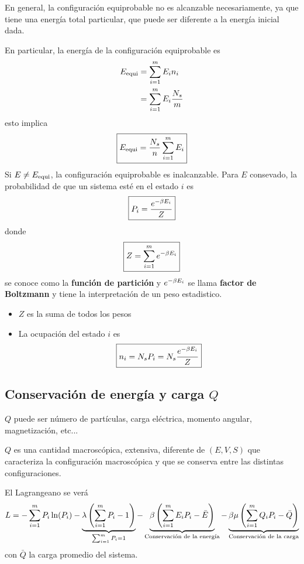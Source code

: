 En general, la configuración equiprobable no es alcanzable necesariamente, ya que tiene una energía total particular, que puede ser diferente a la energía inicial dada.

En particular, la energía de la configuración equiprobable es
\begin{align}
  E_{\rm equi}&=\sum_{i=1}^m E_in_i\\
  &=\sum_{i=1}^m E_i\frac{N_s}{m}
\end{align}
esto implica
\begin{equation}
  \boxed{E_{\rm equi}=\frac{N_s}{n}\sum_{i=1}^m E_i}
\end{equation}
Si $E\neq E_{\rm equi}$, la configuración equiprobable es inalcanzable. Para $E$ consevado, la probabilidad de que un sistema esté en el estado $i$ es
\begin{equation}
 \boxed{P_i=\frac{e^{-\beta E_i}}{Z}}
\end{equation}
donde
\begin{equation}
\boxed{ Z=\sum_{i=1}^m e^{-\beta E_i}}
\end{equation}
se conoce como la \textbf{función de partición} y $e^{-\beta E_i}$ se llama \textbf{factor de Boltzmann} y tiene la interpretación de un peso estadistico.
\begin{itemize}
	\item $Z$ es la suma de todos los pesos
	\item La ocupación del estado $i$ es
	\begin{equation}
\boxed{  n_i=N_sP_i=N_s\frac{e^{-\beta E_i}}{Z}}
\end{equation}
\end{itemize}

\subsection{Conservación de energía y carga $Q$}
$Q$ puede ser número de partículas, carga eléctrica, momento angular, magnetización, etc...

$Q$ es una cantidad macroscópica, extensiva, diferente de $(E,V,S)$ que caracteriza la configuración macroscópica y que se conserva entre las distintas configuraciones.

El Lagrangeano se verá
\begin{equation}
  L=-\sum_{i=1}^m P_i\ln(P_i)-\underbrace{\lambda \left(\sum_{i=1}^m P_i-1\right)}_{\sum_{i=1}^m P_i=1}-\underbrace{\beta\left(\sum_{i=1}^m E_iP_i-\bar{E}\right)}_{\text{Conservación de la energía}}-\underbrace{\beta \mu\left(\sum_{i=1}^m Q_iP_i-\bar{Q}\right)}_{\text{Conservación de la carga}}
\end{equation}
con $\bar{Q}$ la carga promedio del sistema.


